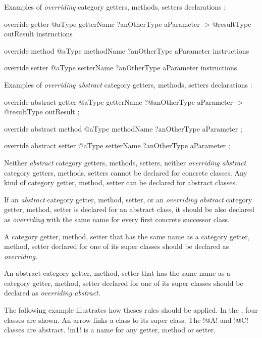 Examples of \emph{overriding} category getters, methods, setters declarations :
\begin{galgas}
override getter @aType getterName
  ?anOtherType aParameter
  -> @resultType outResult
{
  instructions
}

override method @aType methodName
  ?anOtherType aParameter
{
  instructions
}

override setter @aType setterName
  ?anOtherType aParameter
{
  instructions
}
\end{galgas}


Examples of \emph{overriding abstract} category getters, methods, setters declarations :
\begin{galgas}
override abstract getter @aType getterName
  ?@anOtherType aParameter
  -> @resultType outResult
;

override abstract method @aType methodName
  ?anOtherType aParameter
;

override abstract setter @aType setterName
  ?anOtherType aParameter
;
\end{galgas}



Neither \emph{abstract} category getters, methods, setters, neither \emph{overriding abstract} category getters, methods, setters cannot be declared for concrete classes. Any kind of category getter, method, setter can be declared for abstract classes.

If an \emph{abstract} category getter, method, setter, or an \emph{overriding abstract} category getter, method, setter is declared for an abstract class, it should be also declared as \emph{overriding} with the same name for every first concrete successor class.

A category getter, method, setter that has the same name as a category getter, method, setter declared for one of its super classes should be declared as \emph{overriding}.

An abstract category getter, method, setter that has the same name as a category getter, method, setter declared for one of its super classes should be declared as \emph{overriding abstract}.

The following example illustrates how theses rules should be applied. In the , four classes are shown. An arrow links a class to its super class. The \ggs!@A! and \ggs!@C! classes are abstract. \ggs!m1! is a name for any getter, method or setter.

